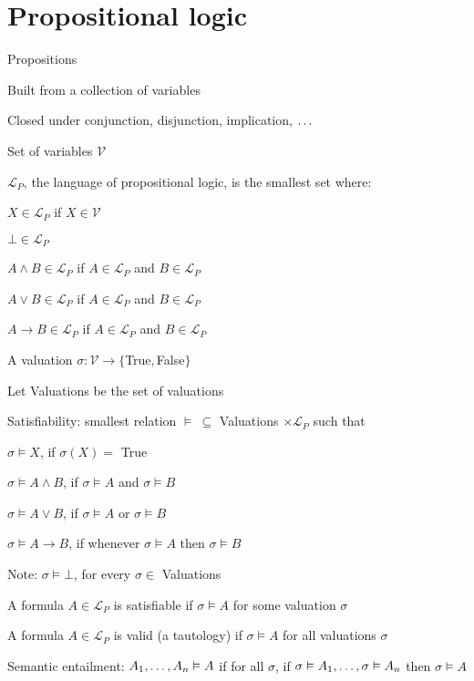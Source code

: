 \section{Propositional logic}
\enumstart
	\item Propositions
	\enumstart
		\item Built from a collection of variables
		\item Closed under conjunction, disjunction, implication, $\mathellipsis$
	\enumend
	\item Set of variables $\mathcal{V}$
	\item $\mathcal{L}_P$, the language of propositional logic, is the smallest set where:
	\enumstart
		\item $X \in \mathcal{L}_P$ if $X \in \mathcal{V}$
		\item $\bot \in \mathcal{L}_P$
		\item $A \land B \in \mathcal{L}_P$ if $A \in \mathcal{L}_P$ and $B \in \mathcal{L}_P$
		\item $A \lor B \in \mathcal{L}_P$ if $A \in \mathcal{L}_P$ and $B \in \mathcal{L}_P$
		\item $A \rightarrow B \in \mathcal{L}_P$ if $A \in \mathcal{L}_P$ and $B \in \mathcal{L}_P$
	\enumend
	\item A valuation $\sigma: \mathcal{V} \rightarrow \{$True$, $False$\}$
	\item Let Valuations be the set of valuations
	\item Satisfiability: smallest relation $\vDash \ \subseteq$ Valuations $ \times \mathcal{L}_P$ such that
	\enumstart
		\item $\sigma \vDash X$, if $\sigma(X) =$ True
		\item $\sigma \vDash A \land B$, if $\sigma \vDash A$ and $\sigma \vDash B$
		\item $\sigma \vDash A \lor B$, if $\sigma \vDash A$ or $\sigma \vDash B$
		\item $\sigma \vDash A \rightarrow B$, if whenever $\sigma \vDash A$ then $\sigma \vDash B$
		\item Note: $\sigma \vDash \bot$, for every $\sigma \in$ Valuations
	\enumend
	\item A formula $A \in \mathcal{L}_P$ is satisfiable if $\sigma \vDash A$ for some valuation $\sigma$
	\item A formula $A \in \mathcal{L}_P$ is valid (a tautology) if $\sigma \vDash A$ for all valuations $\sigma$
	\item Semantic entailment: $A_1, \mathellipsis, A_n \vDash A$ if for all $\sigma$, if $\sigma \vDash A_1, \mathellipsis, \sigma \vDash A_n$ then $\sigma \vDash A$
